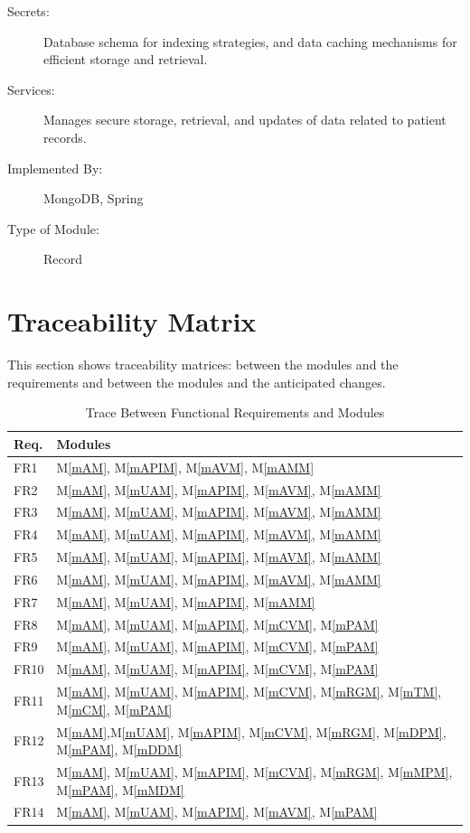 \documentclass[12pt, titlepage]{article}
\newcommand{\mref}[1]{M\ref{#1}}
\begin{document}
\begin{description}
\item[Secrets:]Database schema for indexing strategies, and data caching mechanisms for efficient storage and retrieval.
\item[Services:]Manages secure storage, retrieval, and updates of data related to patient records.
\item[Implemented By:]MongoDB, Spring
\item[Type of Module:]Record
\end{description}


\section{Traceability Matrix} \label{SecTM}

This section shows traceability matrices: between the modules and the requirements and between the modules and the anticipated changes.

\begin{table}[H]
\centering
\begin{tabular}{p{} p{}}
\toprule
\textbf{Req.} & \textbf{Modules}\\
\midrule
FR1 & \mref{mAM}, \mref{mAPIM}, \mref{mAVM}, \mref{mAMM}\\
FR2 & \mref{mAM}, \mref{mUAM}, \mref{mAPIM}, \mref{mAVM}, \mref{mAMM}\\
FR3 & \mref{mAM}, \mref{mUAM}, \mref{mAPIM}, \mref{mAVM}, \mref{mAMM}\\
FR4 & \mref{mAM}, \mref{mUAM}, \mref{mAPIM}, \mref{mAVM}, \mref{mAMM}\\
FR5 & \mref{mAM}, \mref{mUAM}, \mref{mAPIM}, \mref{mAVM}, \mref{mAMM}\\
FR6 & \mref{mAM}, \mref{mUAM}, \mref{mAPIM}, \mref{mAVM}, \mref{mAMM}\\
FR7 & \mref{mAM}, \mref{mUAM}, \mref{mAPIM}, \mref{mAMM}\\
FR8 & \mref{mAM}, \mref{mUAM}, \mref{mAPIM}, \mref{mCVM}, \mref{mPAM}\\
FR9 & \mref{mAM}, \mref{mUAM}, \mref{mAPIM}, \mref{mCVM}, \mref{mPAM}\\
FR10 & \mref{mAM}, \mref{mUAM}, \mref{mAPIM}, \mref{mCVM}, \mref{mPAM}\\
FR11 & \mref{mAM}, \mref{mUAM}, \mref{mAPIM}, \mref{mCVM}, \mref{mRGM}, \mref{mTM}, \mref{mCM}, \mref{mPAM}\\
FR12 & \mref{mAM},\mref{mUAM}, \mref{mAPIM}, \mref{mCVM}, \mref{mRGM}, \mref{mDPM}, \mref{mPAM}, \mref{mDDM}\\
FR13 & \mref{mAM}, \mref{mUAM}, \mref{mAPIM}, \mref{mCVM}, \mref{mRGM}, \mref{mMPM}, \mref{mPAM}, \mref{mMDM}\\
FR14 & \mref{mAM}, \mref{mUAM}, \mref{mAPIM}, \mref{mAVM}, \mref{mPAM}\\
\bottomrule
\end{tabular}
\caption{Trace Between Functional Requirements and Modules}
\label{TblRT}
\end{table}
\end{document}
